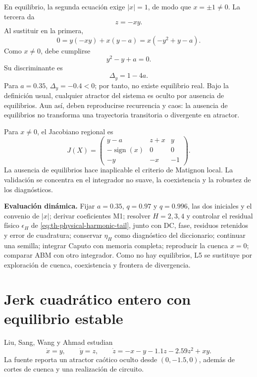 En equilibrio, la segunda ecuación exige \(|x|=1\), de modo que
\(x=\pm1\neq0\). La tercera da
\[
 z=-xy.
\]
Al sustituir en la primera,
\[
 0=y(-xy)+x(y-a)
 =x(-y^2+y-a).
\]
Como \(x\neq0\), debe cumplirse
\begin{equation}
 y^2-y+a=0.
 \label{eq:cand-munoz-equilibrium}
\end{equation}
Su discriminante es
\[
 \Delta_y=1-4a.
\]
Para \(a=0.35\), \(\Delta_y=-0.4<0\); por tanto, no existe equilibrio real.
Bajo la definición usual,
cualquier atractor del sistema es oculto por ausencia de equilibrios. Aun así,
deben reproducirse recurrencia y caos: la ausencia de equilibrios no transforma
una trayectoria transitoria o divergente en atractor.

Para \(x\neq0\), el Jacobiano regional es
\begin{equation}
 J(X)=
 \begin{pmatrix}
 y-a&z+x&y\\
 -\operatorname{sign}(x)&0&0\\
 -y&-x&-1
 \end{pmatrix}.
 \label{eq:cand-munoz-jacobian}
\end{equation}
La ausencia de equilibrios hace inaplicable el criterio de Matignon local. La
validación se concentra en el integrador no suave, la coexistencia y la
robustez de los diagnósticos.

\begin{proposalbox}
\textbf{Evaluación dinámica.} Fijar \(a=0.35\), \(q=0.97\) y \(q=0.996\), las dos
iniciales y el convenio de \(|x|\); derivar coeficientes M1; resolver \(H=2,3,4\)
y controlar el residual físico \(\epsilon_H\) de
\cref{eq:th-physical-harmonic-tail}, junto con DC, fase, residuos retenidos y
error de cuadratura; conservar \(\eta_H\) como diagnóstico del diccionario;
continuar una semilla; integrar Caputo con memoria
completa; reproducir la cuenca \(x=0\); comparar ABM con otro integrador. Como
no hay equilibrios, L5 se sustituye por exploración de cuenca, coexistencia y
frontera de divergencia.
\end{proposalbox}

\section{Jerk cuadrático entero con equilibrio estable}
\label{sec:cand-jerk}

Liu, Sang, Wang y Ahmad \cite{liu2021} estudian
\begin{equation}
 \dot x=y,\qquad
 \dot y=z,\qquad
 \dot z=-x-y-1.1z-2.59z^2+xy.
 \label{eq:cand-jerk}
\end{equation}
La fuente reporta un atractor caótico oculto desde
\((0,-1.5,0)\), además de cortes de cuenca y una realización de circuito.

